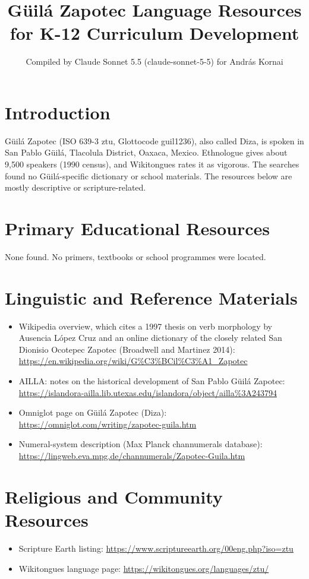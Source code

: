 \documentclass[12pt]{article}
\title{G\"uil\'a Zapotec Language Resources for K-12 Curriculum Development}
\author{Compiled by Claude Sonnet 5.5 (claude-sonnet-5-5) for Andr\'as Kornai}
\date{}
\begin{document}
\maketitle

\section{Introduction}
G\"uil\'a Zapotec (ISO 639-3 ztu, Glottocode guil1236), also called Diza, is spoken in San Pablo G\"uil\'a, Tlacolula District, Oaxaca, Mexico. Ethnologue gives about 9,500 speakers (1990 census), and Wikitongues rates it as vigorous. The searches found no G\"uil\'a-specific dictionary or school materials. The resources below are mostly descriptive or scripture-related.

\section{Primary Educational Resources}
None found. No primers, textbooks or school programmes were located.

\section{Linguistic and Reference Materials}
\begin{itemize}
\item Wikipedia overview, which cites a 1997 thesis on verb morphology by Ausencia L\'opez Cruz and an online dictionary of the closely related San Dionisio Ocotepec Zapotec (Broadwell and Martinez 2014): \url{https://en.wikipedia.org/wiki/G%C3%BCil%C3%A1_Zapotec}
\item AILLA: notes on the historical development of San Pablo G\"uil\'a Zapotec: \url{https://islandora-ailla.lib.utexas.edu/islandora/object/ailla%3A243794}
\item Omniglot page on G\"uil\'a Zapotec (Diza): \url{https://omniglot.com/writing/zapotec-guila.htm}
\item Numeral-system description (Max Planck channumerals database): \url{https://lingweb.eva.mpg.de/channumerals/Zapotec-Guila.htm}
\end{itemize}

\section{Religious and Community Resources}
\begin{itemize}
\item Scripture Earth listing: \url{https://www.scriptureearth.org/00eng.php?iso=ztu}
\item Wikitongues language page: \url{https://wikitongues.org/languages/ztu/}
\end{itemize}
\end{document}
